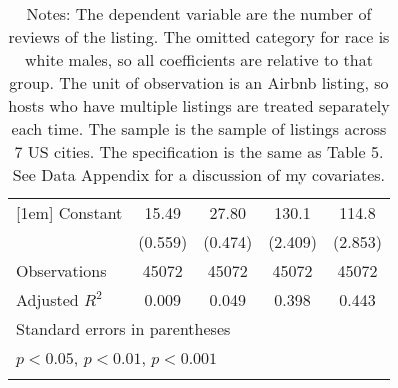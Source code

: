 {\begin{longtable}{l*{4}{c}}
[1em]
Constant            &       15.49\sym{***}&       27.80\sym{***}&       130.1\sym{***}&       114.8\sym{***}\\
                    &     (0.559)         &     (0.474)         &     (2.409)         &     (2.853)         \\
\hline
Observations        &       45072         &       45072         &       45072         &       45072         \\
Adjusted \(R^{2}\)  &       0.009         &       0.049         &       0.398         &       0.443         \\
\hline\hline
\multicolumn{5}{l}{\footnotesize Standard errors in parentheses}\\
\multicolumn{5}{l}{\footnotesize \sym{*} \(p<0.05\), \sym{**} \(p<0.01\), \sym{***} \(p<0.001\)}\\
\caption*{Notes: The dependent variable are the number of reviews of the listing. The omitted category for race is white males, so all coefficients are relative to that group. The unit of observation is an Airbnb listing, so hosts who have multiple listings are treated separately each time. The sample is the sample of listings across 7 US cities. The specification is the same as Table 5. See Data Appendix for a discussion of my covariates.}
\end{longtable}
}


\begin{comment}
[1em]
Middle-aged         &       4.358\sym{***}&       5.298\sym{***}&       0.634         &      -0.101         \\
&     (0.585)         &     (0.562)         &     (0.371)         &     (0.361)         \\
[1em]
Old ($>$65)           &       13.30\sym{***}&       14.75\sym{***}&       2.328         &       0.741         \\
&     (2.130)         &     (1.981)         &     (1.358)         &     (1.265)         \\
\end{comment}
